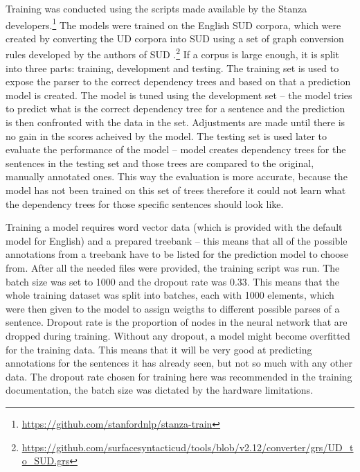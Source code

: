 Training was conducted using the scripts made available by the Stanza developers.\footnote{\url{https://github.com/stanfordnlp/stanza-train}} The models were trained on the English SUD corpora, which were created by converting the UD corpora into SUD using a set of graph conversion rules developed by the authors of SUD \citep{gerdes-etal-2018-sud}.\footnote{\href{https://github.com/surfacesyntacticud/tools/blob/v2.12/converter/grs/UD_to_SUD.grs}{https://github.com/surfacesyntacticud/tools/blob/v2.12/converter/grs/UD_to_SUD.grs}} If a corpus is large enough, it is split into three parts: training, development and testing. The training set is used to expose the parser to the correct dependency trees and based on that a prediction model is created. The model is tuned using the development set -- the model tries to predict what is the correct dependency tree for a sentence and the prediction is then confronted with the data in the set. Adjustments are made until there is no gain in the scores acheived by the model. The testing set is used later to evaluate the performance of the model -- model creates dependency trees for the sentences in the testing set and those trees are compared to the original, manually annotated ones. This way the evaluation is more accurate, because the model has not been trained on this set of trees therefore it could not learn what the dependency trees for those specific sentences should look like.

Training a model requires word vector data (which is provided with the default model for English) and a prepared treebank -- this means that all of the possible annotations from a treebank have to be listed for the prediction model to choose from. After all the needed files were provided, the training script was run. The batch size was set to 1000 and the dropout rate was 0.33. This means that the whole training dataset was split into batches, each with 1000 elements, which were then given to the model to assign weigths to different possible parses of a sentence. Dropout rate is the proportion of nodes in the neural network that are dropped during training. Without any dropout, a model might become overfitted for the training data. This means that it will be very good at predicting annotations for the sentences it has already seen, but not so much with any other data. The dropout rate chosen for training here was recommended in the training documentation, the batch size was dictated by the hardware limitations.

